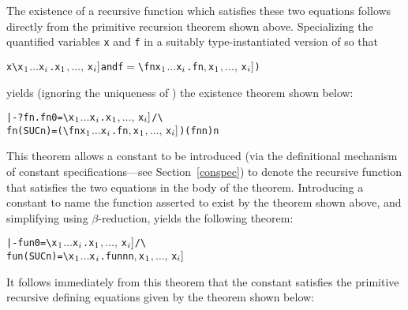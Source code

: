 {{The existence  of  a  recursive  function   which  satisfies these two
equations follows directly from the primitive recursion theorem
 shown above.   Specializing the  quantified variables \verb!x!
and \verb!f!  in  a suitably  type-instantiated version  of  so
that

\begin{hol}\begin{alltt}
   x\m{=}\verb!\!x\(\sb{1}\) \(\dots\) x\(\sb{i}\).\m{f\sb{1}[}x\(\sb{1}\)\(,\ldots,\,\)x\(\sb{i}]\)  {\rm and}  f\(=\)\verb!\!f n x\(\sb{1}\) \(\dots\) x\(\sb{i}\).\m{f\sb{2}[}f  n\(,\) x\(\sb{1}\)\(,\ldots,\,\)x\(\sb{i}]\))
\end{alltt}\end{hol}

\noindent yields (ignoring the uniqueness of ) 
the existence theorem shown below:

\begin{hol}\begin{alltt}
   |- ?fn. fn 0       = \verb!\!x\(\sb{1}\) \(\dots\) x\(\sb{i}\).\m{f\sb{1}[}x\(\sb{1}\)\(,\ldots,\,\)x\(\sb{i}]\) /\verb!\!
           fn (SUC n) = (\verb!\!f n x\(\sb{1}\) \(\dots\) x\(\sb{i}\).\m{f\sb{2}[}f  n\(,\) x\(\sb{1}\)\(,\ldots,\,\)x\(\sb{i}]\)) (fn n) n
\end{alltt}\end{hol}

\noindent This theorem allows a constant  to be introduced (via the
definitional mechanism of constant specifications---see Section~\ref{conspec})
to denote the recursive function that satisfies the two equations in the body
of the theorem. Introducing a constant  to name the function asserted
to exist by the theorem shown above, and simplifying using $\beta$-reduction,
yields the following theorem:

\begin{hol}\begin{alltt}
   |- fun 0       = \verb!\!x\(\sb{1}\) \(\dots\) x\(\sb{i}\).\m{f\sb{1}[}x\(\sb{1}\)\(,\ldots,\,\)x\(\sb{i}]\) /\verb!\!
      fun (SUC n) = \verb!\!x\(\sb{1}\) \(\dots\) x\(\sb{i}\).\m{f\sb{2}[}fun n  n\(,\) x\(\sb{1}\)\(,\ldots,\,\)x\(\sb{i}]\)
\end{alltt}\end{hol}

\noindent It follows immediately from this theorem that the constant 
satisfies the primitive recursive defining equations given by the theorem shown
below:

}}
